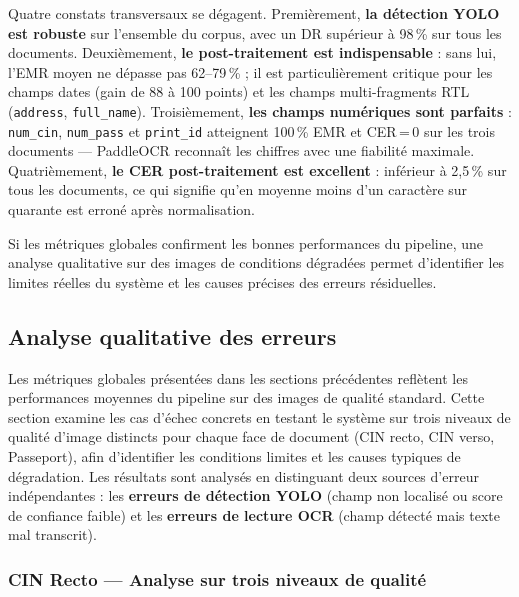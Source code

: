 \noindent Quatre constats transversaux se dégagent. Premièrement, \textbf{la détection YOLO est robuste} sur l'ensemble du corpus, avec un DR supérieur à 98\,\% sur tous les documents. Deuxièmement, \textbf{le post-traitement est indispensable} : sans lui, l'EMR moyen ne dépasse pas 62--79\,\% ; il est particulièrement critique pour les champs dates (gain de 88 à 100 points) et les champs multi-fragments RTL (\texttt{address}, \texttt{full\_name}). Troisièmement, \textbf{les champs numériques sont parfaits} : \texttt{num\_cin}, \texttt{num\_pass} et \texttt{print\_id} atteignent 100\,\% EMR et CER\,=\,0 sur les trois documents --- PaddleOCR reconnaît les chiffres avec une fiabilité maximale. Quatrièmement, \textbf{le CER post-traitement est excellent} : inférieur à 2,5\,\% sur tous les documents, ce qui signifie qu'en moyenne moins d'un caractère sur quarante est erroné après normalisation.

\medskip

Si les métriques globales confirment les bonnes performances du pipeline, une analyse qualitative sur des images de conditions dégradées permet d'identifier les limites réelles du système et les causes précises des erreurs résiduelles.

\subsection{Analyse qualitative des erreurs}
\label{subsec:analyse-erreurs}

Les métriques globales présentées dans les sections précédentes reflètent les performances moyennes du pipeline sur des images de qualité standard. Cette section examine les cas d'échec concrets en testant le système sur trois niveaux de qualité d'image distincts pour chaque face de document (CIN recto, CIN verso, Passeport), afin d'identifier les conditions limites et les causes typiques de dégradation. Les résultats sont analysés en distinguant deux sources d'erreur indépendantes : les \textbf{erreurs de détection YOLO} (champ non localisé ou score de confiance faible) et les \textbf{erreurs de lecture OCR} (champ détecté mais texte mal transcrit).

\subsubsection{CIN Recto --- Analyse sur trois niveaux de qualité}

